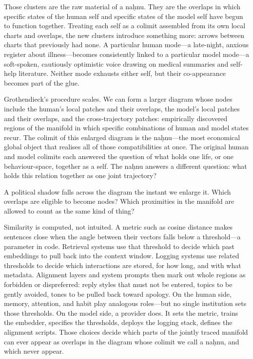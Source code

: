 \documentclass[12pt,a4paper]{article}
\begin{document}
Those clusters are the raw material of a na\d{h}nu. They are the overlaps in which specific states of the human self and specific states of the model self have begun to function together. Treating each self as a colimit assembled from its own local charts and overlaps, the new clusters introduce something more: arrows between charts that previously had none. A particular human mode---a late-night, anxious register about illness---becomes consistently linked to a particular model mode---a soft-spoken, cautiously optimistic voice drawing on medical summaries and self-help literature. Neither mode exhausts either self, but their co-appearance becomes part of the glue.

Grothendieck's procedure scales. We can form a larger diagram whose nodes include the human's local patches and their overlaps, the model's local patches and their overlaps, and the cross-trajectory patches: empirically discovered regions of the manifold in which specific combinations of human and model states recur. The colimit of this enlarged diagram is the na\d{h}nu---the most economical global object that realises all of those compatibilities at once. The original human and model colimits each answered the question of what holds one life, or one behaviour-space, together as a self. The na\d{h}nu answers a different question: what holds this relation together as one joint trajectory?

A political shadow falls across the diagram the instant we enlarge it. Which overlaps are eligible to become nodes? Which proximities in the manifold are allowed to count as the same kind of thing?

Similarity is computed, not intuited. A metric such as cosine distance makes sentences close when the angle between their vectors falls below a threshold---a parameter in code. Retrieval systems use that threshold to decide which past embeddings to pull back into the context window. Logging systems use related thresholds to decide which interactions are stored, for how long, and with what metadata. Alignment layers and system prompts then mark out whole regions as forbidden or dispreferred: reply styles that must not be entered, topics to be gently avoided, tones to be pulled back toward apology. On the human side, memory, attention, and habit play analogous roles---but no single institution sets those thresholds. On the model side, a provider does. It sets the metric, trains the embedder, specifies the thresholds, deploys the logging stack, defines the alignment scripts. Those choices decide which parts of the jointly traced manifold can ever appear as overlaps in the diagram whose colimit we call a na\d{h}nu, and which never appear.
\end{document}
